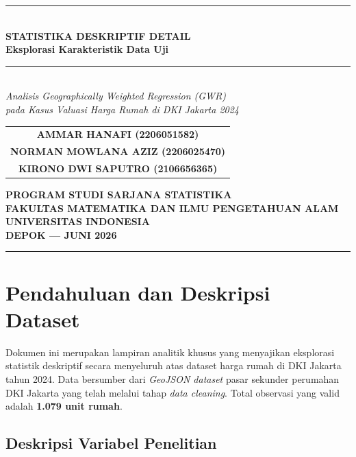 \documentclass[12pt,a4paper]{article}
\begin{document}
\begin{titlepage}
\centering
\vspace*{1.5cm}
{\color{headerblue}\rule{\linewidth}{3pt}}\\[0.4cm]
{\LARGE\bfseries\color{headerblue} STATISTIKA DESKRIPTIF DETAIL}\\[0.3cm]
{\Large\bfseries Eksplorasi Karakteristik Data Uji}\\[0.15cm]
{\color{headerblue}\rule{\linewidth}{1pt}}\\[0.5cm]
{\large\textit{Analisis Geographically Weighted Regression (GWR)}\\
\textit{pada Kasus Valuasi Harga Rumah di DKI Jakarta 2024}}\\[2cm]

\begin{tabular}{c}
{\normalsize\textbf{AMMAR HANAFI (2206051582)}} \\[3pt]
{\normalsize\textbf{NORMAN MOWLANA AZIZ (2206025470)}} \\[3pt]
{\normalsize\textbf{KIRONO DWI SAPUTRO (2106656365)}} \\
\end{tabular}

\vfill
{\normalsize\textbf{PROGRAM STUDI SARJANA STATISTIKA}\\
\textbf{FAKULTAS MATEMATIKA DAN ILMU PENGETAHUAN ALAM}\\
\textbf{UNIVERSITAS INDONESIA}\\[0.3cm]
\textbf{DEPOK --- JUNI 2026}}\\[0.5cm]
{\color{headerblue}\rule{\linewidth}{2pt}}
\end{titlepage}

\tableofcontents
\newpage

\section{Pendahuluan dan Deskripsi Dataset}

Dokumen ini merupakan lampiran analitik khusus yang menyajikan eksplorasi statistik
deskriptif secara menyeluruh atas dataset harga rumah di DKI Jakarta tahun 2024.
Data bersumber dari \textit{GeoJSON dataset} pasar sekunder perumahan DKI Jakarta
yang telah melalui tahap \textit{data cleaning}. Total observasi yang valid adalah
\textbf{1.079 unit rumah}.

\subsection{Deskripsi Variabel Penelitian}
\end{document}
